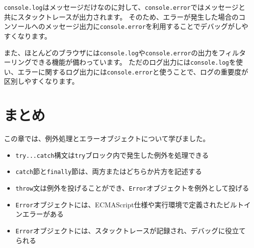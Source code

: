 \texttt{console.log}はメッセージだけなのに対して、\texttt{console.error}ではメッセージと共にスタックトレースが出力されます。
そのため、エラーが発生した場合のコンソールへのメッセージ出力に\texttt{console.error}を利用することでデバッグがしやすくなります。

また、ほとんどのブラウザには\texttt{console.log}や\texttt{console.error}の出力をフィルターリングできる機能が備わっています。
ただのログ出力には\texttt{console.log}を使い、エラーに関するログ出力には\texttt{console.error}と使うことで、ログの重要度が区別しやすくなります。

\hypertarget{conclusion}{%
\section{まとめ}\label{conclusion}}

この章では、例外処理とエラーオブジェクトについて学びました。

\begin{itemize}
\item
  \texttt{try...catch}構文は\texttt{try}ブロック内で発生した例外を処理できる
\item
  \texttt{catch}節と\texttt{finally}節は、両方またはどちらか片方を記述する
\item
  \texttt{throw}文は例外を投げることができ、\texttt{Error}オブジェクトを例外として投げる
\item
  \texttt{Error}オブジェクトには、ECMAScript仕様や実行環境で定義されたビルトインエラーがある
\item
  \texttt{Error}オブジェクトには、スタックトレースが記録され、デバッグに役立てられる
\end{itemize}
